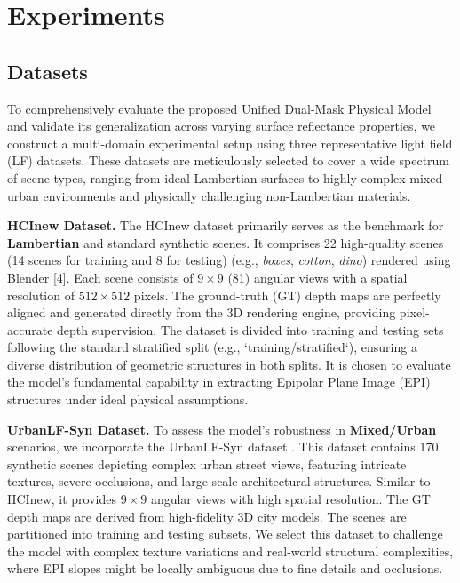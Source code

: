 \section{Experiments}

\subsection{Datasets}

To comprehensively evaluate the proposed Unified Dual-Mask Physical Model and validate its generalization across varying surface reflectance properties, we construct a multi-domain experimental setup using three representative light field (LF) datasets. These datasets are meticulously selected to cover a wide spectrum of scene types, ranging from ideal Lambertian surfaces to highly complex mixed urban environments and physically challenging non-Lambertian materials. 

\textbf{HCInew Dataset.} The HCInew dataset primarily serves as the benchmark for \textbf{Lambertian} and standard synthetic scenes. It comprises 22 high-quality scenes (14 scenes for training and 8 for testing) (e.g., \textit{boxes}, \textit{cotton}, \textit{dino}) rendered using Blender [4]. Each scene consists of $9 \times 9$ (81) angular views with a spatial resolution of $512 \times 512$ pixels. The ground-truth (GT) depth maps are perfectly aligned and generated directly from the 3D rendering engine, providing pixel-accurate depth supervision. The dataset is divided into training and testing sets following the standard stratified split (e.g., `training/stratified`), ensuring a diverse distribution of geometric structures in both splits. It is chosen to evaluate the model's fundamental capability in extracting Epipolar Plane Image (EPI) structures under ideal physical assumptions.

\textbf{UrbanLF-Syn Dataset.} To assess the model's robustness in \textbf{Mixed/Urban} scenarios, we incorporate the UrbanLF-Syn dataset . This dataset contains 170 synthetic scenes depicting complex urban street views, featuring intricate textures, severe occlusions, and large-scale architectural structures. Similar to HCInew, it provides $9 \times 9$ angular views with high spatial resolution. The GT depth maps are derived from high-fidelity 3D city models. The scenes are partitioned into training and testing subsets. We select this dataset to challenge the model with complex texture variations and real-world structural complexities, where EPI slopes might be locally ambiguous due to fine details and occlusions.

